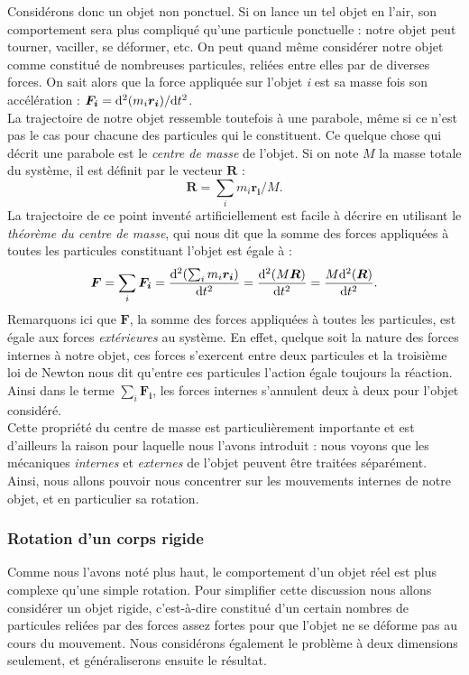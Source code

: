 Considérons donc un objet non ponctuel. Si on lance un tel objet en l'air, son comportement sera plus compliqué qu'une particule ponctuelle : notre objet peut tourner, vaciller, se déformer, etc. On peut quand même considérer notre objet comme constitué de nombreuses particules, reliées entre elles par de diverses forces. On sait alors que la force appliquée sur l'objet \textit{i} est sa masse fois son accélération : $\bm{F_i} = \mathrm{d}^2(m_i\bm{r_i})/\mathrm{d} t^2$. \\La trajectoire de notre objet ressemble toutefois à une parabole, même si ce n'est pas le cas pour chacune des particules qui le constituent. Ce quelque chose qui décrit une parabole est le \textit{centre de masse} de l'objet. Si on note $M$ la masse totale du système, il est définit par le vecteur $\bm{R}$ :
\begin{equation*}
\bm{R} = \sum_i{m_i\bm{r_i}/M}.
\end{equation*}
La trajectoire de ce point inventé artificiellement est facile à décrire en utilisant le \textit{théorème du centre de masse}, qui nous dit que la somme des forces appliquées à toutes les particules constituant l'objet est égale à :
\begin{equation*}
\bm{F} = \sum_i{\bm{F_i}} = \frac{\mathrm{d}^2(\sum_i{m_i\bm{r_i}})}{\mathrm{d} t^2} = \frac{\mathrm{d}^2(M\bm{R})}{\mathrm{d} t^2} = \frac{M\mathrm{d}^2(\bm{R})}{\mathrm{d} t^2}.
\end{equation*}
Remarquons ici que $\bm{F}$, la somme des forces appliquées à toutes les particules, est égale aux forces \textit{extérieures} au système. En effet, quelque soit la nature des forces internes à notre objet, ces forces s'exercent entre deux particules et la troisième loi de Newton nous dit qu'entre ces particules l'action égale toujours la réaction. Ainsi dans le terme $\sum_i{\bm{F_i}}$, les forces internes s'annulent deux à deux pour l'objet considéré.\\ Cette propriété du centre de masse est particulièrement importante et est d'ailleurs la raison pour laquelle nous l'avons introduit : nous voyons que les mécaniques \textit{internes} et \textit{externes} de l'objet peuvent être traitées séparément. Ainsi, nous allons pouvoir nous concentrer sur les mouvements internes de notre objet, et en particulier sa rotation.

\subsubsection{Rotation d'un corps rigide}
Comme nous l'avons noté plus haut, le comportement d'un objet réel est plus complexe qu'une simple rotation. Pour simplifier cette discussion nous allons considérer un objet rigide, c'est-à-dire constitué d'un certain nombres de particules reliées par des forces assez fortes pour que l'objet ne se déforme pas au cours du mouvement. Nous considérons également le problème à deux dimensions seulement, et généraliserons ensuite le résultat.

